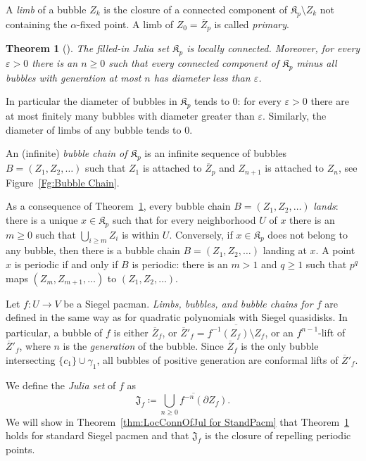 \documentclass[]{amsart}
\newcommand\Jul{{\mathfrak J}}
\newcommand\Kfilled{{\mathfrak K}}
\newtheorem{thm}{Theorem}[section]
\theoremstyle{remark}
\numberwithin{equation}{section}
\theoremstyle{definition}
\begin{document}
A \emph{limb} of a bubble $Z_k$  is the closure of a connected component of $\Kfilled_p\setminus Z_k$ not containing the $\alpha$-fixed point. A limb of $Z_0=\overline Z_p$ is called \emph{primary}. 

\begin{thm}[\cite{Pe}]
\label{thm:K_P is LocConn}
The filled-in Julia set $\Kfilled_p$ is locally connected. Moreover, for every $\varepsilon>0$ there is an $n\ge 0$ such that every connected component of $\Kfilled_p$ minus all bubbles with generation at most $n$ has diameter less than $\varepsilon$.
\end{thm}
In particular the diameter of bubbles in $\Kfilled_p$ tends to $0$: for every $\varepsilon>0$ there are at most finitely many bubbles with diameter greater than $\varepsilon$. Similarly, the diameter of limbs of any bubble tends to $0$.


An (infinite) \emph{bubble chain of $\Kfilled_p$} is an infinite sequence of bubbles $B=(Z_1,Z_2,\dots )$ such that $Z_1$ is attached to $\overline Z_p$ and $Z_{n+1}$ is attached to $Z_n$, see Figure~\ref{Fg:Bubble Chain}.

As a consequence of Theorem~\ref{thm:K_P is LocConn}, every bubble chain $B=(Z_1,Z_2,\dots )$ \emph{lands}: there is a unique $x\in \Kfilled_p$ such that for every neighborhood $U$ of $x$ there is an $m\ge 0$ such that $\displaystyle\bigcup_{i\ge m}Z_i$ is within $U$. Conversely, if $x\in  \Kfilled_p$ does not belong to any bubble, then there is a bubble chain $B=(Z_1,Z_2,\dots )$ landing at $x$. A point $x$ is periodic if and only if $B$ is periodic: there is an $m>1$ and $q\ge 1$ such that $p^q$ maps $(Z_m,Z_{m+1},\dots)$ to $(Z_1,Z_2,\dots )$.


Let $f\colon U\to V$ be a Siegel pacman. \emph{Limbs, bubbles, and bubble chains for $f$} are defined in the same way as for quadratic polynomials with Siegel quasidisks. In particular, a bubble of $f$ is either $\overline Z_f$, or $\overline Z'_f = \overline {f^{-1}(Z_f)\setminus Z_f}$, or an $f^{n-1}$-lift of $\overline Z'_f$, where $n$ is the \emph{generation} of the bubble. Since $\overline Z_f$ is the only bubble intersecting $\{c_1\}\cup \gamma_1$, all bubbles of positive generation are conformal lifts of $\overline Z'_f$. 

We define the \emph{Julia set} of $f$ as
\begin{equation}
\label{eq:Jul f}
\Jul_f\coloneqq \overline{ \bigcup_{n\ge 0} f^{-n} (\partial Z_f) }.\end{equation}
We will show in Theorem~\ref{thm:LocConnOfJul for StandPacm} that Theorem~\ref{thm:K_P is LocConn} holds for standard Siegel pacmen and that $\Jul_f$ is the closure of repelling periodic points. 
\end{document}
